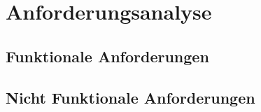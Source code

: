 \chapter{Anforderungsanalyse}	
\label{cha:anforderungsanalyse}

\section{Funktionale Anforderungen}
\label{sec:anforderungsanalyse:funktional}


\section{Nicht Funktionale Anforderungen}
\label{sec:anforderungsanalyse:nichtfunktional}
